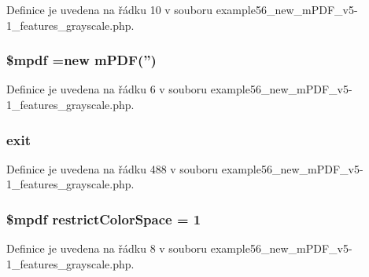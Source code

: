 Definice je uvedena na řádku 10 v souboru example56\-\_\-new\-\_\-m\-P\-D\-F\-\_\-v5-\/1\-\_\-features\-\_\-grayscale.\-php.

\hypertarget{example56__new__m_p_d_f__v5-1__features__grayscale_8php_ad028f81910d6cbab9b184d2214b3a8f8}{
\subsubsection[{\$mpdf}]{\setlength{\rightskip}{0pt plus 5cm}\$mpdf =new {\bf m\-P\-D\-F}('')}}\label{example56__new__m_p_d_f__v5-1__features__grayscale_8php_ad028f81910d6cbab9b184d2214b3a8f8}


Definice je uvedena na řádku 6 v souboru example56\-\_\-new\-\_\-m\-P\-D\-F\-\_\-v5-\/1\-\_\-features\-\_\-grayscale.\-php.

\hypertarget{example56__new__m_p_d_f__v5-1__features__grayscale_8php_a6733eb5f605d09eaede9845835d71c4e}{
\subsubsection[{exit}]{\setlength{\rightskip}{0pt plus 5cm}exit}}\label{example56__new__m_p_d_f__v5-1__features__grayscale_8php_a6733eb5f605d09eaede9845835d71c4e}


Definice je uvedena na řádku 488 v souboru example56\-\_\-new\-\_\-m\-P\-D\-F\-\_\-v5-\/1\-\_\-features\-\_\-grayscale.\-php.

\hypertarget{example56__new__m_p_d_f__v5-1__features__grayscale_8php_ace17057950eda2558dd7cc2c539d2df4}{
\subsubsection[{restrict\-Color\-Space}]{\setlength{\rightskip}{0pt plus 5cm}\$mpdf restrict\-Color\-Space = 1}}\label{example56__new__m_p_d_f__v5-1__features__grayscale_8php_ace17057950eda2558dd7cc2c539d2df4}


Definice je uvedena na řádku 8 v souboru example56\-\_\-new\-\_\-m\-P\-D\-F\-\_\-v5-\/1\-\_\-features\-\_\-grayscale.\-php.

